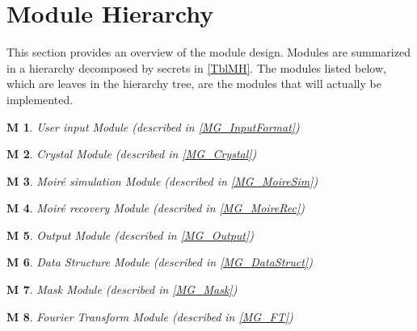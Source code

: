 \documentclass[12pt, titlepage]{article}
\newtheorem{M}{M}
\begin{document}
\newpage

\tableofcontents

\listoftables

\listoffigures

\newpage


\section{Module Hierarchy} \label{SecMH}

This section provides an overview of the module design. Modules are summarized
in a hierarchy decomposed by secrets in \cref{TblMH}. The modules listed
below, which are leaves in the hierarchy tree, are the modules that will
actually be implemented.

\begin{M}\normalfont User input Module (described in \cref{MG_InputFormat})
\label{M_InputFormat}
\end{M}

\begin{M}\normalfont Crystal Module (described in \cref{MG_Crystal})
\label{M_Crystal}
\end{M}

\begin{M}\normalfont Moir{\'e} simulation Module (described in \cref{MG_MoireSim})
\label{M_MoireSim}
\end{M}

\begin{M}\normalfont Moir{\'e} recovery Module (described in \cref{MG_MoireRec})
\label{M_MoireRec}
\end{M}

\begin{M}\normalfont Output Module (described in \cref{MG_Output})
\label{M_Output}
\end{M}

\begin{M}\normalfont Data Structure Module (described in \cref{MG_DataStruct})
\label{M_DataStruct}
\end{M}

\begin{M}\normalfont Mask Module (described in \cref{MG_Mask})
\label{M_Mask}
\end{M}

\begin{M}\normalfont Fourier Transform Module (described in \cref{MG_FT})
\label{M_FT}
\end{M}
\end{document}
